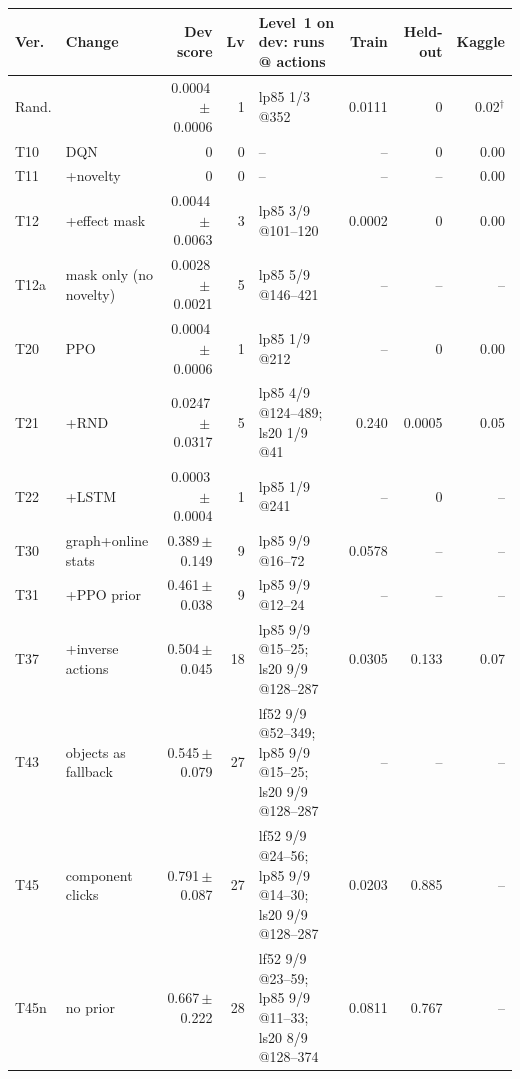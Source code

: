 \begin{tabular}{@{}llrrlrrr@{}}
\toprule
Ver. & Change & Dev score & Lv & Level~1 on dev: runs @ actions & Train & Held-out & Kaggle \\
\midrule
Rand. &  & 0.0004\,$\pm$\,0.0006 & 1 & lp85 1/3 @352 & 0.0111 & 0 & 0.02$^\dagger$ \\
\midrule
T10 & DQN & 0 & 0 & -- & -- & 0 & 0.00 \\
T11 & +novelty & 0 & 0 & -- & -- & -- & 0.00 \\
T12 & +effect mask & 0.0044\,$\pm$\,0.0063 & 3 & lp85 3/9 @101--120 & 0.0002 & 0 & 0.00 \\
T12a & mask only (no novelty) & 0.0028\,$\pm$\,0.0021 & 5 & lp85 5/9 @146--421 & -- & -- & -- \\
\midrule
T20 & PPO & 0.0004\,$\pm$\,0.0006 & 1 & lp85 1/9 @212 & -- & 0 & 0.00 \\
T21 & +RND & 0.0247\,$\pm$\,0.0317 & 5 & lp85 4/9 @124--489; ls20 1/9 @41 & 0.240 & 0.0005 & 0.05 \\
T22 & +LSTM & 0.0003\,$\pm$\,0.0004 & 1 & lp85 1/9 @241 & -- & 0 & -- \\
\midrule
T30 & graph+online stats & 0.389\,$\pm$\,0.149 & 9 & lp85 9/9 @16--72 & 0.0578 & -- & -- \\
T31 & +PPO prior & 0.461\,$\pm$\,0.038 & 9 & lp85 9/9 @12--24 & -- & -- & -- \\
T37 & +inverse actions & 0.504\,$\pm$\,0.045 & 18 & lp85 9/9 @15--25; ls20 9/9 @128--287 & 0.0305 & 0.133 & 0.07 \\
T43 & objects as fallback & 0.545\,$\pm$\,0.079 & 27 & lf52 9/9 @52--349; lp85 9/9 @15--25; ls20 9/9 @128--287 & -- & -- & -- \\
T45 & component clicks & 0.791\,$\pm$\,0.087 & 27 & lf52 9/9 @24--56; lp85 9/9 @14--30; ls20 9/9 @128--287 & 0.0203 & 0.885 & -- \\
T45n & no prior & 0.667\,$\pm$\,0.222 & 28 & lf52 9/9 @23--59; lp85 9/9 @11--33; ls20 8/9 @128--374 & 0.0811 & 0.767 & -- \\
\bottomrule
\end{tabular}
